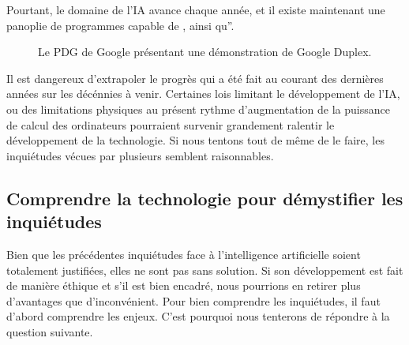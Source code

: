 \documentclass[letterpaper,10pt,french]{sphinxmanual}
\begin{document}
Pourtant, le domaine de l’IA avance chaque année, et il existe maintenant une
panoplie de programmes capable de
,
ainsi qu”.

\begin{figure}[htbp]
\centering
\capstart

\noindent{}
\caption{Le PDG de Google présentant une démonstration de Google Duplex.}\label{\detokenize{enonce_sujet:duplex-presentation}}\end{figure}

Il est dangereux d’extrapoler le progrès qui a été fait au courant des dernières
années sur les décénnies à venir. Certaines lois limitant le développement de
l’IA, ou des limitations physiques au présent rythme d’augmentation de la
puissance de calcul des ordinateurs pourraient survenir grandement ralentir
le développement de la technologie. Si nous tentons tout de même de le faire,
les inquiétudes vécues par plusieurs semblent raisonnables.


\subsection{Comprendre la technologie pour démystifier les inquiétudes}
\label{\detokenize{enonce_sujet:comprendre-la-technologie-pour-demystifier-les-inquietudes}}
Bien que les précédentes inquiétudes face à l’intelligence artificielle soient
totalement justifiées, elles ne sont pas sans solution. Si son développement
est fait de manière éthique et s’il est bien encadré, nous pourrions en retirer
plus d’avantages que d’inconvénient. Pour bien comprendre les inquiétudes, il
faut d’abord comprendre les enjeux. C’est pourquoi nous tenterons de répondre
à la question suivante.

\end{document}
